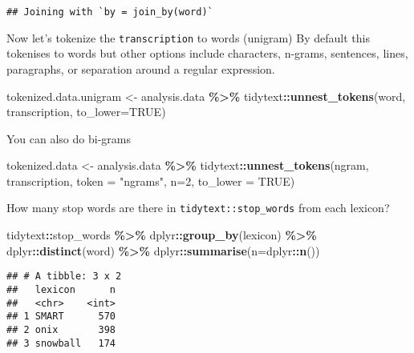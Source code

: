\documentclass[
]{article}
\newenvironment{Shaded}{\begin{snugshade}}{\end{snugshade}}
\newcommand{\AttributeTok}[1]{\textcolor[rgb]{0.13,0.29,0.53}{#1}}
\newcommand{\ConstantTok}[1]{\textcolor[rgb]{0.56,0.35,0.01}{#1}}
\newcommand{\DecValTok}[1]{\textcolor[rgb]{0.00,0.00,0.81}{#1}}
\newcommand{\FunctionTok}[1]{\textcolor[rgb]{0.13,0.29,0.53}{\textbf{#1}}}
\newcommand{\NormalTok}[1]{#1}
\newcommand{\OtherTok}[1]{\textcolor[rgb]{0.56,0.35,0.01}{#1}}
\newcommand{\SpecialCharTok}[1]{\textcolor[rgb]{0.81,0.36,0.00}{\textbf{#1}}}
\newcommand{\StringTok}[1]{\textcolor[rgb]{0.31,0.60,0.02}{#1}}
\begin{document}
\begin{verbatim}
## Joining with `by = join_by(word)`
\end{verbatim}

Now let's tokenize the \texttt{transcription} to words (unigram) By
default this tokenises to words but other options include characters,
n-grams, sentences, lines, paragraphs, or separation around a regular
expression.

\begin{Shaded}
\begin{Highlighting}[]
\NormalTok{tokenized.data.unigram }\OtherTok{\textless{}{-}}\NormalTok{ analysis.data }\SpecialCharTok{\%\textgreater{}\%}\NormalTok{ tidytext}\SpecialCharTok{::}\FunctionTok{unnest\_tokens}\NormalTok{(word, transcription, }\AttributeTok{to\_lower=}\ConstantTok{TRUE}\NormalTok{)}
\end{Highlighting}
\end{Shaded}

You can also do bi-grams

\begin{Shaded}
\begin{Highlighting}[]
\NormalTok{tokenized.data }\OtherTok{\textless{}{-}}\NormalTok{ analysis.data }\SpecialCharTok{\%\textgreater{}\%}\NormalTok{ tidytext}\SpecialCharTok{::}\FunctionTok{unnest\_tokens}\NormalTok{(ngram, transcription, }\AttributeTok{token =} \StringTok{"ngrams"}\NormalTok{, }\AttributeTok{n=}\DecValTok{2}\NormalTok{, }\AttributeTok{to\_lower =} \ConstantTok{TRUE}\NormalTok{)}
\end{Highlighting}
\end{Shaded}

How many stop words are there in \texttt{tidytext::stop\_words} from
each lexicon?

\begin{Shaded}
\begin{Highlighting}[]
\NormalTok{tidytext}\SpecialCharTok{::}\NormalTok{stop\_words }\SpecialCharTok{\%\textgreater{}\%}\NormalTok{ dplyr}\SpecialCharTok{::}\FunctionTok{group\_by}\NormalTok{(lexicon) }\SpecialCharTok{\%\textgreater{}\%}\NormalTok{ dplyr}\SpecialCharTok{::}\FunctionTok{distinct}\NormalTok{(word) }\SpecialCharTok{\%\textgreater{}\%}\NormalTok{ dplyr}\SpecialCharTok{::}\FunctionTok{summarise}\NormalTok{(}\AttributeTok{n=}\NormalTok{dplyr}\SpecialCharTok{::}\FunctionTok{n}\NormalTok{())}
\end{Highlighting}
\end{Shaded}

\begin{verbatim}
## # A tibble: 3 x 2
##   lexicon      n
##   <chr>    <int>
## 1 SMART      570
## 2 onix       398
## 3 snowball   174
\end{verbatim}
\end{document}
